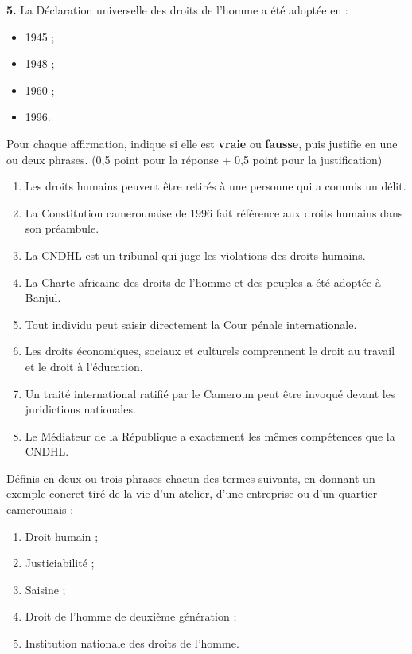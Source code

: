 \documentclass[11pt]{article}
\begin{document}
\begin{exercice}
\textbf{5.} La Déclaration universelle des droits de l'homme a été adoptée en :
\begin{itemize}
\item[a)] 1945 ; \item[b)] 1948 ; \item[c)] 1960 ; \item[d)] 1996.
\end{itemize}
\end{exercice}

\begin{exercice}
Pour chaque affirmation, indique si elle est \textbf{vraie} ou \textbf{fausse}, puis justifie en une ou deux phrases. (0,5 point pour la réponse + 0,5 point pour la justification)

\begin{enumerate}
\item Les droits humains peuvent être retirés à une personne qui a commis un délit.
\item La Constitution camerounaise de 1996 fait référence aux droits humains dans son préambule.
\item La CNDHL est un tribunal qui juge les violations des droits humains.
\item La Charte africaine des droits de l'homme et des peuples a été adoptée à Banjul.
\item Tout individu peut saisir directement la Cour pénale internationale.
\item Les droits économiques, sociaux et culturels comprennent le droit au travail et le droit à l'éducation.
\item Un traité international ratifié par le Cameroun peut être invoqué devant les juridictions nationales.
\item Le Médiateur de la République a exactement les mêmes compétences que la CNDHL.
\end{enumerate}
\end{exercice}

\begin{exercice}
Définis en deux ou trois phrases chacun des termes suivants, en donnant un exemple concret tiré de la vie d'un atelier, d'une entreprise ou d'un quartier camerounais :
\begin{enumerate}
\item Droit humain ;
\item Justiciabilité ;
\item Saisine ;
\item Droit de l'homme de deuxième génération ;
\item Institution nationale des droits de l'homme.
\end{enumerate}
\end{exercice}
\end{document}
